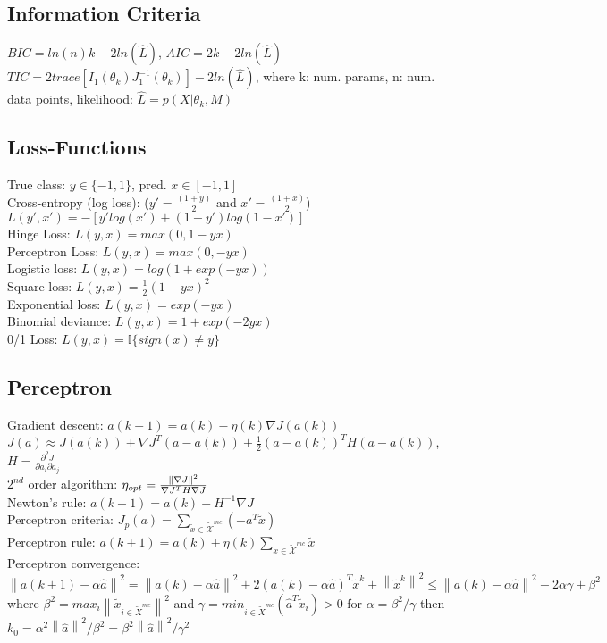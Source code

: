 \subsection*{Information Criteria}
$BIC = ln(n)k - 2ln(\hat{L})$, $AIC = 2k - 2ln(\hat{L})$\\
$TIC = 2trace[I_1(\theta_k)J_1^{-1}(\theta_k)] - 2ln(\hat{L})$, 
where k: num. params, n: num. data points, likelihood: $\hat{L}=p(X|\theta_k,M)$  

\subsection*{Loss-Functions}
True class: $y \in \{-1,1\}$, pred. $x \in [-1,1]$\\
Cross-entropy (log loss): ($y'=\tfrac{(1+y)}{2}$ and $x'=\tfrac{(1+x)}{2}$) $L(y',x') {=} -[y'log(x') {+} (1-y')log(1-x')]$ \\
Hinge Loss: $L(y,x) = max(0, 1-yx)$ \\
Perceptron Loss: $L(y,x) = max(0, -yx)$ \\
Logistic loss: $L(y,x) = log(1 + exp(-yx))$ \\
Square loss: $L(y,x) = \tfrac{1}{2}(1-yx)^2$ \\
Exponential loss: $L(y,x) = exp(-yx)$ \\
Binomial deviance: $L(y,x) = 1 + exp(-2yx)$ \\
0/1 Loss: $L(y,x) = \mathbb{I}\{sign(x)\neq y\}$

\subsection*{Perceptron} 
Gradient descent: $a(k+1) = a(k) - \eta(k)\nabla J(a(k))$ \\
$J(a)\approx J(a(k))+\nabla J^T(a-a(k)) + \tfrac{1}{2}(a-a(k))^T H (a-a(k))$, $H{=}\frac{\partial^2 J}{\partial a_i \partial a_j}$ \\
$2^{nd}$ order algorithm: $\eta_{opt} = \frac{\left\lVert\nabla J\right\rVert^2}{\nabla J^T H \nabla J}$ \\
Newton's rule: $a(k+1){=}a(k){-}H^{{-}1}\nabla J$\\
Perceptron criteria: $J_p(a)=\sum_{\widetilde{x}\in\widetilde{\mathcal{X}}^{mc}} (-a^T \widetilde{x})$ \\
Perceptron rule: $a(k+1)=a(k)+\eta(k)\sum_{\widetilde{x}\in\widetilde{\mathcal{X}}^{mc}} \widetilde{x}$ \\
Perceptron convergence:$\left \| a(k+1)- \alpha \hat a \right \|^{2} = \left \| a(k)- \alpha \hat a \right \|^{2}  + 2(a(k)- \alpha \hat a)^{T} \tilde x^{k} + \left \| \tilde x^{k} \right \|^{2} \leq \left \| a(k)- \alpha \hat a \right \|^{2} -2\alpha \gamma + \beta ^{2}$
where $\beta^{2} = max_{i}  \left \| \tilde x_{i \in \tilde X^{mc} } \right \| ^{2}$ and $\gamma = min_{i \in \tilde X^{mc} } (\hat a^{T} \tilde x_{i}) > 0 $ for $\alpha= \beta^{2} / \gamma$  then $k_{0}= \alpha^{2}\left \|\hat a \right \|^{2} / \beta^{2}=  \beta^{2}\left \|\hat a \right \|^{2} / \gamma^{2}$

